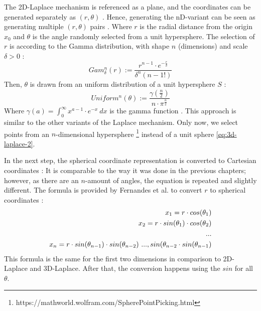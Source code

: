 The 2D-Laplace mechanism is referenced as a plane, and the coordinates can be generated separately as $(r, \theta)$ \citep{fernandes_generalised_2019,DBLP:journals/corr/abs-1212-1984}.
Hence, generating the nD-variant can be seen as generating multiple $(r, \theta)$ pairs \citep{fernandes_generalised_2019}.
Where $r$ is the radial distance from the origin $x_0$ and $\theta$ is the angle randomly selected from a unit hypersphere.
The selection of $r$ is according to the Gamma distribution, with shape $n$ (dimensions) and scale $\delta > 0$ \citep{fernandes_generalised_2019}:
\begin{equation}
  Gam^n_\delta(r) := \frac{r^{n-1}\cdot e^{-\frac{r}{\delta}}}{\delta^n(n-1!)}
  \label{eq:generate_r_for_nd_laplace}
\end{equation}
Then, $\theta$ is drawn from an uniform distribution of a unit hypersphere $S$ \citep{fernandes_generalised_2019}:
\begin{equation}
  Uniform^n(\theta) := \frac{\gamma(\frac{n}{2})}{n \cdot \pi ^{\frac{n}{2}}}
  \label{eq:generate_theta_for_nd_laplace}
\end{equation}
Where $\gamma(a) = \int^\infty_0 x^{a-1} \cdot e^{-x} \ dx$ is the gamma function \citep{fernandes_generalised_2019}.
This approach is similar to the other variants of the Laplace mechanism.
Only now, we select points from an $n$-dimensional hypersphere  \footnote{https://mathworld.wolfram.com/SpherePointPicking.html} instead of a unit sphere \ref{eq:3d-laplace-2}. \newline

In the next step, the spherical coordinate representation is converted to Cartesian coordinates \citep{fernandes_generalised_2019}:
It is comparable to the way it was done in the previous chapters; however, as there are an $n$-amount of angles, the equation is repeated and slightly different.
The formula is provided by Fernandes et al. to convert $r$ to spherical coordinates \citep{fernandes_generalised_2019}:
\begin{align}
  x_1 = r \cdot cos (\theta_1) \notag                                      \\
  x_2 = r \cdot sin (\theta_1) \cdot cos (\theta_2)                        \notag \\
  ... \notag \\
  x_n = r \cdot sin(\theta_{n-1}) \cdot sin(\theta_{n-2}) \ ..., sin(\theta_{n-2} \cdot sin(\theta_{n-1})
  \label{eq:nd-laplace-cartesian}
\end{align}
This formula is the same for the first two dimensions in comparison to 2D-Laplace and 3D-Laplace. After that, the conversion happens using the $sin$ for all $\theta$.

